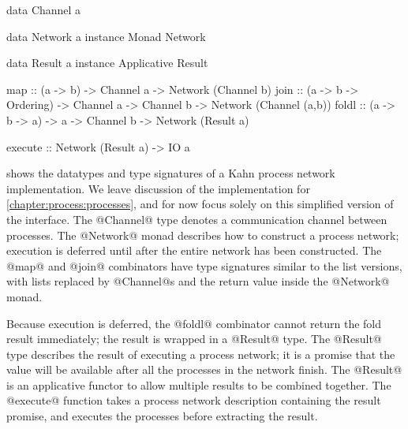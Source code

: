 \begin{haskell}[float,caption=Types and combinators for Kahn process networks,label=figs/kpn/combinators]
data Channel a

data Network a
instance Monad Network

data Result  a
instance Applicative Result

map     :: (a -> b) -> Channel a
        -> Network (Channel b)
join    :: (a -> b -> Ordering) -> Channel a -> Channel b
        -> Network (Channel (a,b))
foldl   :: (a -> b -> a) -> a -> Channel b
        -> Network (Result a)

execute :: Network (Result a) -> IO a
\end{haskell}

 shows the datatypes and type signatures of a Kahn process network implementation.
We leave discussion of the implementation for \cref{chapter:process:processes}, and for now focus solely on this simplified version of the interface.
The @Channel@ type denotes a communication channel between processes.
The @Network@ monad describes how to construct a process network; execution is deferred until after the entire network has been constructed.
The @map@ and @join@ combinators have type signatures similar to the list versions, with lists replaced by @Channel@s and the return value inside the @Network@ monad.

Because execution is deferred, the @foldl@ combinator cannot return the fold result immediately; the result is wrapped in a @Result@ type.
The @Result@ type describes the result of executing a process network; it is a promise that the value will be available after all the processes in the network finish.
The @Result@ is an applicative functor to allow multiple results to be combined together.
The @execute@ function takes a process network description containing the result promise, and executes the processes before extracting the result.



